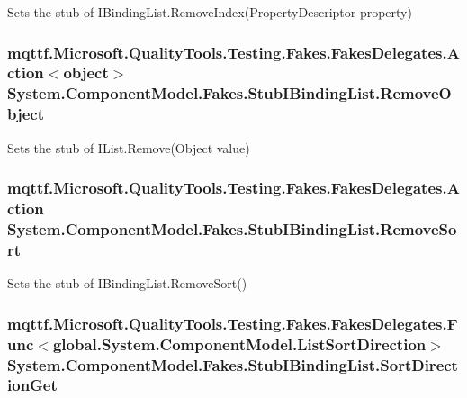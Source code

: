 Sets the stub of I\-Binding\-List.\-Remove\-Index(\-Property\-Descriptor property)

\hypertarget{class_system_1_1_component_model_1_1_fakes_1_1_stub_i_binding_list_aebba0abeb566a273f8c0f6a5714838b9}{
\subsubsection[{Remove\-Object}]{\setlength{\rightskip}{0pt plus 5cm}mqttf.\-Microsoft.\-Quality\-Tools.\-Testing.\-Fakes.\-Fakes\-Delegates.\-Action$<$object$>$ System.\-Component\-Model.\-Fakes.\-Stub\-I\-Binding\-List.\-Remove\-Object}}\label{class_system_1_1_component_model_1_1_fakes_1_1_stub_i_binding_list_aebba0abeb566a273f8c0f6a5714838b9}


Sets the stub of I\-List.\-Remove(\-Object value)

\hypertarget{class_system_1_1_component_model_1_1_fakes_1_1_stub_i_binding_list_ad6648d82160b496b215d45e10485c5a3}{
\subsubsection[{Remove\-Sort}]{\setlength{\rightskip}{0pt plus 5cm}mqttf.\-Microsoft.\-Quality\-Tools.\-Testing.\-Fakes.\-Fakes\-Delegates.\-Action System.\-Component\-Model.\-Fakes.\-Stub\-I\-Binding\-List.\-Remove\-Sort}}\label{class_system_1_1_component_model_1_1_fakes_1_1_stub_i_binding_list_ad6648d82160b496b215d45e10485c5a3}


Sets the stub of I\-Binding\-List.\-Remove\-Sort()

\hypertarget{class_system_1_1_component_model_1_1_fakes_1_1_stub_i_binding_list_ab5d3822775a2d3b4cdf7bd91cd7c55c0}{
\subsubsection[{Sort\-Direction\-Get}]{\setlength{\rightskip}{0pt plus 5cm}mqttf.\-Microsoft.\-Quality\-Tools.\-Testing.\-Fakes.\-Fakes\-Delegates.\-Func$<$global.\-System.\-Component\-Model.\-List\-Sort\-Direction$>$ System.\-Component\-Model.\-Fakes.\-Stub\-I\-Binding\-List.\-Sort\-Direction\-Get}}\label{class_system_1_1_component_model_1_1_fakes_1_1_stub_i_binding_list_ab5d3822775a2d3b4cdf7bd91cd7c55c0}


